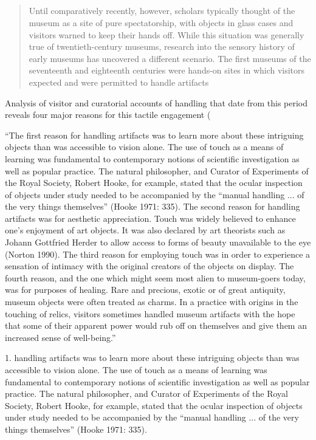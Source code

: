 \subsection{\cite{howes_introduction_2014}}

\begin{quotation}
    Until comparatively recently, however, scholars typically thought of the museum as a site of pure spectatorship, with objects in glass cases and visitors warned to keep their hands off. While this situation was generally true of twentieth-century museums, research into the sensory history of early museums has uncovered a different scenario. The first museums of the seventeenth and eighteenth centuries were hands-on sites in which visitors expected and were permitted to handle artifacts
\end{quotation}

Analysis of visitor and curatorial accounts of handling that date from this period reveals four major reasons for this tactile engagement (\cite{classen_touch_2005}

``The first reason for handling artifacts was to learn more about these intriguing objects than was accessible to vision alone. The use of touch as a means of learning was fundamental to contemporary notions of scientific investigation as well as popular practice. The natural philosopher, and Curator of Experiments of the Royal Society, Robert Hooke, for example, stated that the ocular inspection of objects under study needed to be accompanied by the “manual handling ... of the very things themselves” (Hooke 1971: 335). The second reason for handling artifacts was for aesthetic appreciation. Touch was widely believed to enhance one’s enjoyment of art objects. It was also declared by art theorists such as Johann Gottfried Herder to allow access to forms of beauty unavailable to the eye (Norton 1990). The third reason for employing touch was in order to experience a sensation of intimacy with the original creators of the objects on display. The fourth reason, and the one which might seem most alien to museum-goers today, was for purposes of healing. Rare and precious, exotic or of great antiquity, museum objects were often treated as charms. In a practice with origins in the touching of relics, visitors sometimes handled museum artifacts with the hope that some of their apparent power would rub off on themselves and give them an increased sense of well-being.''


1. handling artifacts was to learn more about these intriguing objects than was accessible to vision alone. The use of touch as a means of learning was fundamental to contemporary notions of scientific investigation as well as popular practice. The natural philosopher, and Curator of Experiments of the Royal Society, Robert Hooke, for example, stated that the ocular inspection of objects under study needed to be accompanied by the “manual handling ... of the very things themselves” (Hooke 1971: 335). 

